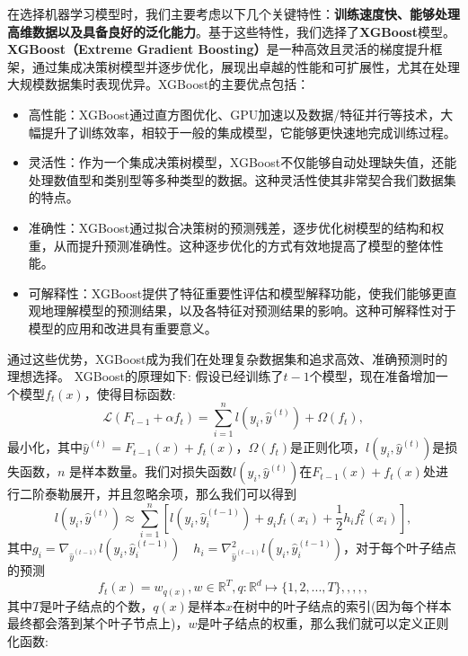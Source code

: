 在选择机器学习模型时，我们主要考虑以下几个关键特性：\textbf{训练速度快、能够处理高维数据以及具备良好的泛化能力}。基于这些特性，我们选择了\textbf{XGBoost}模型。\textbf{XGBoost（Extreme Gradient Boosting）}\cite{10.1145/2939672.2939785}是一种高效且灵活的梯度提升框架，通过集成决策树模型并逐步优化，展现出卓越的性能和可扩展性，尤其在处理大规模数据集时表现优异。XGBoost的主要优点包括：
\begin{itemize}
	\item 高性能：XGBoost通过直方图优化、GPU加速以及数据/特征并行等技术，大幅提升了训练效率，相较于一般的集成模型，它能够更快速地完成训练过程。
	\item 灵活性：作为一个集成决策树模型，XGBoost不仅能够自动处理缺失值，还能处理数值型和类别型等多种类型的数据。这种灵活性使其非常契合我们数据集的特点。
	\item 准确性：XGBoost通过拟合决策树的预测残差，逐步优化树模型的结构和权重，从而提升预测准确性。这种逐步优化的方式有效地提高了模型的整体性能。
	\item 可解释性：XGBoost提供了特征重要性评估和模型解释功能，使我们能够更直观地理解模型的预测结果，以及各特征对预测结果的影响。这种可解释性对于模型的应用和改进具有重要意义。
\end{itemize}
通过这些优势，XGBoost成为我们在处理复杂数据集和追求高效、准确预测时的理想选择。
XGBoost的原理如下:
假设已经训练了$t-1$个模型，现在准备增加一个模型$f_t(x)$，使得目标函数:
\begin{equation}
	\mathcal{L}(F_{t-1}+\alpha f_t)=\sum_{i=1}^{n}l(y_i,\hat{y}^{(t)})+\Omega(f_t),
\end{equation}
最小化，其中$\hat{y}^{(t)}=F_{t-1}(x)+f_t(x)$，$\Omega(f_t)$是正则化项，$l(y_i,\hat{y}^{(t)})$是损失函数，$n$ 是样本数量。我们对损失函数$l(y_i,\hat{y}^{(t)})$在$F_{t-1}(x)+f_t(x)$处进行二阶泰勒展开，并且忽略余项，那么我们可以得到
\begin{equation}
	l(y_i,\hat{y}^{(t)})\approx\sum_{i=1}^{n}\left[l\left(y_{i},\hat{y}_{i}^{(t-1)}\right)+g_{i}f_{t}(x_{i})+\frac{1}{2}h_{i}f_{t}^{2}(x_{i})\right],
\end{equation}
其中$g_i=\nabla_{\hat{y}^{(t-1)}}l\left(y_i,\hat{y}_i^{(t-1)}\right)\quad h_i=\nabla_{\hat{y}^{(t-1)}}^2l\left(y_i,\hat{y}_i^{(t-1)}\right)$，对于每个叶子结点的预测
\begin{equation}
	f_t(x)=w_{q(x)},w\in\mathbb{R}^T,q\colon\mathbb{R}^d\mapsto\{1,2,...,T\},,,,,
\end{equation}
其中$T$是叶子结点的个数，$q(x)$是样本$x$在树中的叶子结点的索引(因为每个样本最终都会落到某个叶子节点上)，$w$是叶子结点的权重，那么我们就可以定义正则化函数:
